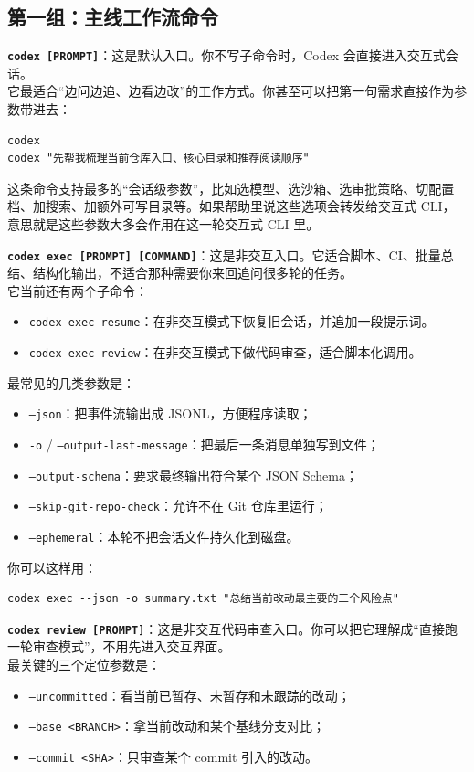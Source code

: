 \documentclass[UTF8,a4paper,12pt]{ctexart}
\begin{document}
\subsection{第一组：主线工作流命令}

\textbf{\texttt{codex [PROMPT]}}：这是默认入口。你不写子命令时，Codex 会直接进入交互式会话。\\
它最适合“边问边追、边看边改”的工作方式。你甚至可以把第一句需求直接作为参数带进去：

\begin{lstlisting}[style=cli]
codex
codex "先帮我梳理当前仓库入口、核心目录和推荐阅读顺序"
\end{lstlisting}

这条命令支持最多的“会话级参数”，比如选模型、选沙箱、选审批策略、切配置档、加搜索、加额外可写目录等。如果帮助里说这些选项会转发给交互式 CLI，意思就是这些参数大多会作用在这一轮交互式 CLI 里。

\medskip
\textbf{\texttt{codex exec [PROMPT] [COMMAND]}}：这是非交互入口。它适合脚本、CI、批量总结、结构化输出，不适合那种需要你来回追问很多轮的任务。\\
它当前还有两个子命令：
\begin{itemize}
  \item \texttt{codex exec resume}：在非交互模式下恢复旧会话，并追加一段提示词。
  \item \texttt{codex exec review}：在非交互模式下做代码审查，适合脚本化调用。
\end{itemize}

最常见的几类参数是：
\begin{itemize}
  \item \texttt{--json}：把事件流输出成 JSONL，方便程序读取；
  \item \texttt{-o} / \texttt{--output-last-message}：把最后一条消息单独写到文件；
  \item \texttt{--output-schema}：要求最终输出符合某个 JSON Schema；
  \item \texttt{--skip-git-repo-check}：允许不在 Git 仓库里运行；
  \item \texttt{--ephemeral}：本轮不把会话文件持久化到磁盘。
\end{itemize}

你可以这样用：

\begin{lstlisting}[style=cli]
codex exec --json -o summary.txt "总结当前改动最主要的三个风险点"
\end{lstlisting}

\medskip
\textbf{\texttt{codex review [PROMPT]}}：这是非交互代码审查入口。你可以把它理解成“直接跑一轮审查模式”，不用先进入交互界面。\\
最关键的三个定位参数是：
\begin{itemize}
  \item \texttt{--uncommitted}：看当前已暂存、未暂存和未跟踪的改动；
  \item \texttt{--base <BRANCH>}：拿当前改动和某个基线分支对比；
  \item \texttt{--commit <SHA>}：只审查某个 commit 引入的改动。
\end{itemize}
\end{document}
